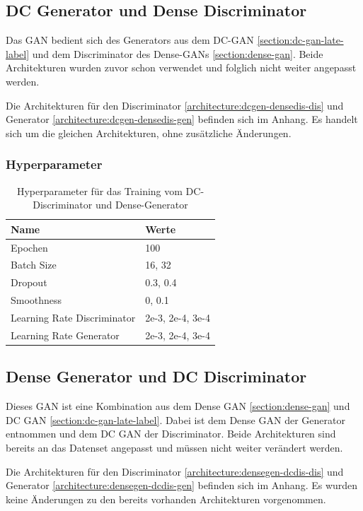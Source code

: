\subsection{DC Generator und Dense Discriminator}
Das GAN bedient sich des Generators aus dem DC-GAN \cref{section:dc-gan-late-label} und dem Discriminator des Dense-GANs \cref{section:dense-gan}.
Beide Architekturen wurden zuvor schon verwendet und folglich nicht weiter angepasst werden.

Die Architekturen für den Discriminator \cref{architecture:dcgen-densedis-dis} und Generator \cref{architecture:dcgen-densedis-gen} befinden sich im Anhang.
Es handelt sich um die gleichen Architekturen, ohne zusätzliche Änderungen.

\subsubsection{Hyperparameter}
\begin{table}[H]
	\centering
	\begin{tabular}{l l}
		Name                        & Werte            \\ \hline
		Epochen                     & 100              \\
		Batch Size                  & 16, 32           \\
		Dropout                     & 0.3, 0.4         \\
		Smoothness                  & 0, 0.1           \\
		Learning Rate Discriminator & 2e-3, 2e-4, 3e-4 \\
		Learning Rate Generator     & 2e-3, 2e-4, 3e-4
	\end{tabular}
	\caption{Hyperparameter für das Training vom DC-Discriminator und Dense-Generator}
\end{table}

\subsection{Dense Generator und DC Discriminator}
Dieses GAN ist eine Kombination aus dem Dense GAN \cref{section:dense-gan} und DC GAN \cref{section:dc-gan-late-label}.
Dabei ist dem Dense GAN der Generator entnommen und dem DC GAN der Discriminator.
Beide Architekturen sind bereits an das Datenset angepasst und müssen nicht weiter verändert werden.

Die Architekturen für den Discriminator \cref{architecture:densegen-dcdis-dis} und Generator \cref{architecture:densegen-dcdis-gen} befinden sich im Anhang.
Es wurden keine Änderungen zu den bereits vorhanden Architekturen vorgenommen.

